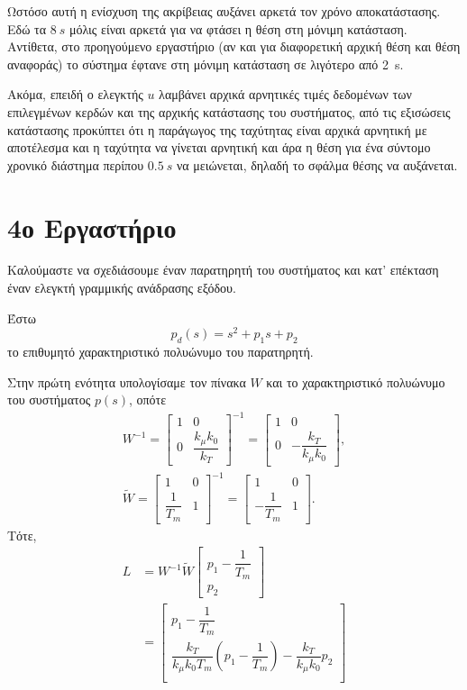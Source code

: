 \documentclass[12pt]{article}
\begin{document}
Ωστόσο αυτή η ενίσχυση της ακρίβειας αυξάνει αρκετά τον χρόνο αποκατάστασης. Εδώ τα \(\SI{8 }{s }\) μόλις είναι αρκετά για να φτάσει η θέση στη μόνιμη κατάσταση. Αντίθετα, στο προηγούμενο εργαστήριο (αν και για διαφορετική  αρχική θέση και θέση αναφοράς) το σύστημα έφτανε στη μόνιμη κατάσταση σε λιγότερο από \SI{2}{s}. 

Ακόμα, επειδή ο ελεγκτής \(u\) λαμβάνει αρχικά αρνητικές τιμές δεδομένων των επιλεγμένων κερδών και της αρχικής κατάστασης του συστήματος, από τις εξισώσεις κατάστασης προκύπτει ότι η παράγωγος της ταχύτητας είναι αρχικά αρνητική με αποτέλεσμα και η ταχύτητα να γίνεται αρνητική και άρα η θέση για ένα σύντομο χρονικό διάστημα περίπου \(\SI{0.5}{s }\) να μειώνεται, δηλαδή το σφάλμα θέσης να αυξάνεται.

\section*{4ο Εργαστήριο}
Καλούμαστε να σχεδιάσουμε έναν παρατηρητή του συστήματος και κατ' επέκταση έναν ελεγκτή γραμμικής ανάδρασης εξόδου.

Έστω  
\begin{equation*}
    p_d(s) = s^2 + p_1 s + p_2 
\end{equation*}
το επιθυμητό χαρακτηριστικό πολυώνυμο του παρατηρητή.

Στην πρώτη ενότητα υπολογίσαμε τον πίνακα \(W\) και το χαρακτηριστικό πολυώνυμο του συστήματος \(p(s)\), οπότε
\begin{gather*}
    W^{-1} =  \begin{bmatrix}
        1 & 0 \\
        0 & \dfrac{k_\mu k_0}{k_T}
    \end{bmatrix}^{-1} = 
    \begin{bmatrix}
        1 & 0 \\
        0 & -\dfrac{k_T}{k_\mu k_0} 
    \end{bmatrix}, \\
    \tilde{W} = \begin{bmatrix}
        1 & 0 \\
        \dfrac{1}{T_m } & 1
    \end{bmatrix}^{-1} = \begin{bmatrix}
        1 & 0 \\
        -\dfrac{1}{T_m } & 1
    \end{bmatrix}. 
\end{gather*}
Τότε, 
\begin{align*}
    L &= W^{-1} \tilde{W} \begin{bmatrix}
        p_1 - \dfrac{1}{T_m } \\ 
        p_2 
    \end{bmatrix} \\
    &= \begin{bmatrix}
        p_1 - \dfrac{1}{T_m } \\ 
        \dfrac{k_T }{k_\mu k_0 T_m }\left( p_1 - \dfrac{1}{T_m }\right) - \dfrac{k_T }{k_\mu k_0} p_2\\ 
    \end{bmatrix}
\end{align*}
\end{document}
